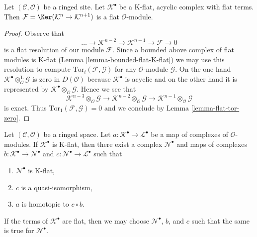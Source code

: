\begin{lemma}
\label{lemma-K-flat-flat-acyclic}
Let $(\mathcal{C}, \mathcal{O})$ be a ringed site. Let $\mathcal{K}^\bullet$
be a K-flat, acyclic complex with flat terms. Then
$\mathcal{F} = \Ker(\mathcal{K}^n \to \mathcal{K}^{n + 1})$
is a flat $\mathcal{O}$-module.
\end{lemma}

\begin{proof}
Observe that
$$
\ldots \to \mathcal{K}^{n - 2} \to \mathcal{K}^{n - 1} \to
\mathcal{F} \to 0
$$
is a flat resolution of our module $\mathcal{F}$. Since a bounded above complex
of flat modules is K-flat (Lemma \ref{lemma-bounded-flat-K-flat})
we may use this resolution to compute
$\text{Tor}_i(\mathcal{F}, \mathcal{G})$ for any
$\mathcal{O}$-module $\mathcal{G}$. On the one hand
$\mathcal{K}^\bullet \otimes_\mathcal{O}^\mathbf{L} \mathcal{G}$
is zero in $D(\mathcal{O})$ because $\mathcal{K}^\bullet$ is acyclic
and on the other hand it is represented by
$\mathcal{K}^\bullet \otimes_\mathcal{O} \mathcal{G}$.
Hence we see that
$$
\mathcal{K}^{n - 3} \otimes_\mathcal{O} \mathcal{G} \to
\mathcal{K}^{n - 2} \otimes_\mathcal{O} \mathcal{G} \to
\mathcal{K}^{n - 1} \otimes_\mathcal{O} \mathcal{G}
$$
is exact. Thus $\text{Tor}_1(\mathcal{F}, \mathcal{G}) = 0$
and we conclude by Lemma \ref{lemma-flat-tor-zero}.
\end{proof}

\begin{lemma}
\label{lemma-factor-through-K-flat}
Let $(\mathcal{C}, \mathcal{O})$ be a ringed space.
Let $a : \mathcal{K}^\bullet \to \mathcal{L}^\bullet$ be a map of complexes
of $\mathcal{O}$-modules. If $\mathcal{K}^\bullet$ is K-flat, then
there exist a complex $\mathcal{N}^\bullet$ and maps of complexes
$b : \mathcal{K}^\bullet \to \mathcal{N}^\bullet$
and $c : \mathcal{N}^\bullet \to \mathcal{L}^\bullet$ such that
\begin{enumerate}
\item $\mathcal{N}^\bullet$ is K-flat,
\item $c$ is a quasi-isomorphism,
\item $a$ is homotopic to $c \circ b$.
\end{enumerate}
If the terms of $\mathcal{K}^\bullet$ are flat, then we may choose
$\mathcal{N}^\bullet$, $b$, and $c$
such that the same is true for $\mathcal{N}^\bullet$.
\end{lemma}


